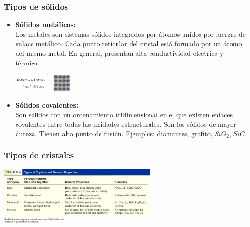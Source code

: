         \subsubsection{Tipos de sólidos}
            \begin{itemize}
                \item \textbf{Sólidos metálicos:} \\
                    \sangria{} Los metales son sistemas sólidos integrados por átomos unidos por fuerzas de enlace metálico. Cada punto reticular del cristal está formado por un átomo del mismo metal. En general, presentan alta conductividad eléctrica y térmica.
                    \begin{center} \includegraphics[width=3cm]{./imagenes/solidosMetalicos.png} \end{center}
                \item \textbf{Sólidos covalentes:} \\
                    \sangria{} Son sólidos con un ordenamiento tridimensional en el que existen enlaces covalentes entre todas las unidades estructurales. Son los sólidos de mayor dureza. Tienen alto punto de fusión. Ejemplos: diamantes, grafito, $SiO_2$, $SiC$.
            \end{itemize}
        \subsubsection{Tipos de cristales}
            \begin{center} \includegraphics[width=8cm]{./imagenes/tiposDeCristales.png} \end{center}
